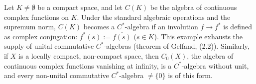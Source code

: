 Let $K \neq \emptyset$ be a compact space, and let $C(K)$ be the algebra of continuous complex functions on $K$. Under the standard algebraic operations and the supremum norm, $C(K)$ becomes a $C^*$-algebra if an involution $f \to f^*$ is defined as complex conjugation: $f^*(s) := \overline{f(s)}$ ($s \in K$). This example exhausts the supply of unital commutative $C^*$-algebras (theorem of Gelfand, (2.2)). Similarly, if $X$ is a locally compact, non-compact space, then $C_0(X)$, the algebra of continuous complex functions vanishing at infinity, is a $C^*$-algebra without unit, and every non-unital commutative $C^*$-algebra $\neq \{0\}$ is of this form.
